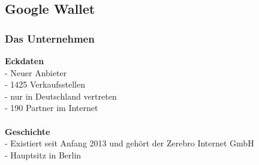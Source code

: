 \subsection{Google Wallet}
\subsubsection{Das Unternehmen}

\textbf{Eckdaten}\\
- Neuer Anbieter\\
- 1425 Verkaufsstellen\\
- nur in Deutschland vertreten\\
- 190 Partner im Internet\\
\\
%
%
\textbf{Geschichte}\\
- Existiert seit Anfang 2013 und gehört der Zerebro Internet GmbH\\
- Hauptsitz in Berlin\\

